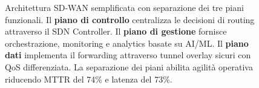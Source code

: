 \documentclass{article}
\begin{document}
\begin{figure}[htbp]
\caption{Architettura SD-WAN semplificata con separazione dei tre piani funzionali. Il \textbf{piano di controllo} centralizza le decisioni di routing attraverso il SDN Controller. Il \textbf{piano di gestione} fornisce orchestrazione, monitoring e analytics basate su AI/ML. Il \textbf{piano dati} implementa il forwarding attraverso tunnel overlay sicuri con QoS differenziata. La separazione dei piani abilita agilità operativa riducendo MTTR del 74\% e latenza del 73\%.}
\label{fig:sdwan_architecture_simplified}
\end{figure}
\end{document}
